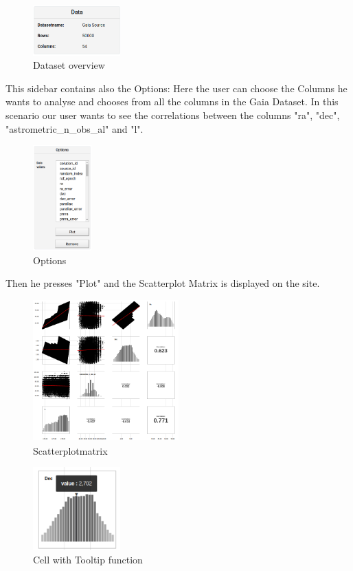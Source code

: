 \documentclass{vgtc}                          %
\begin{document}
\begin{figure}[H]
\includegraphics[width=0.3\textwidth]{1d.png}
\centering
\caption{Dataset overview}
\end{figure}

 This sidebar contains also the Options: Here the user can choose the Columns he wants to analyse and chooses from all the columns in the Gaia Dataset. In this scenario our user wants to see the correlations between the columns "ra", "dec", "astrometric\_n\_obs\_al" and "l".
 
\begin{figure}[H]
\includegraphics[width=0.2\textwidth]{options.png}
\centering
\caption{Options}
\end{figure} 
 
Then he presses "Plot" and the Scatterplot Matrix is displayed on the site.

\begin{figure}[H]
\includegraphics[width=0.5\textwidth]{scattermatrix.png}
\centering
\caption{Scatterplotmatrix}
\end{figure}

\begin{figure}[H]
\includegraphics[width=0.3\textwidth]{tooltip.png}
\centering
\caption{Cell with Tooltip function}
\end{figure}
\end{document}
